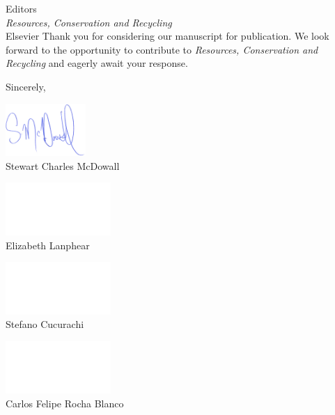 \documentclass[10pt]{letter}
\begin{document}
\begin{letter}{Editors\\\textit{Resources, Conservation and Recycling}\\Elsevier}
Thank you for considering our manuscript for publication. We look forward to the opportunity to contribute to \textit{Resources, Conservation and Recycling} and eagerly await your response.

\vspace{1em}

\closing{Sincerely,}
\begin{center}
    \begin{minipage}[t]{0.25\textwidth}
      \centering
      \vspace{-2cm}
      \includegraphics[height=2cm]{signature_scm.png}\\ %
      Stewart Charles McDowall\\
    \end{minipage}%
    \begin{minipage}[t]{0.25\textwidth}
      \centering
      \vspace{-2cm}
      \includegraphics[height=2cm]{dummy_signature.png}\\ %
      Elizabeth Lanphear
    \end{minipage}%
    \begin{minipage}[t]{0.25\textwidth}
      \centering
      \vspace{-2cm}
      \includegraphics[height=2cm]{dummy_signature.png}\\ %
      Stefano Cucurachi
    \end{minipage}%
    \begin{minipage}[t]{0.25\textwidth}
      \centering
      \vspace{-2cm}
      \includegraphics[height=2cm]{dummy_signature.png}\\ %
      Carlos Felipe Rocha Blanco
    \end{minipage}
  \end{center}
  
\end{letter}
\end{document}

